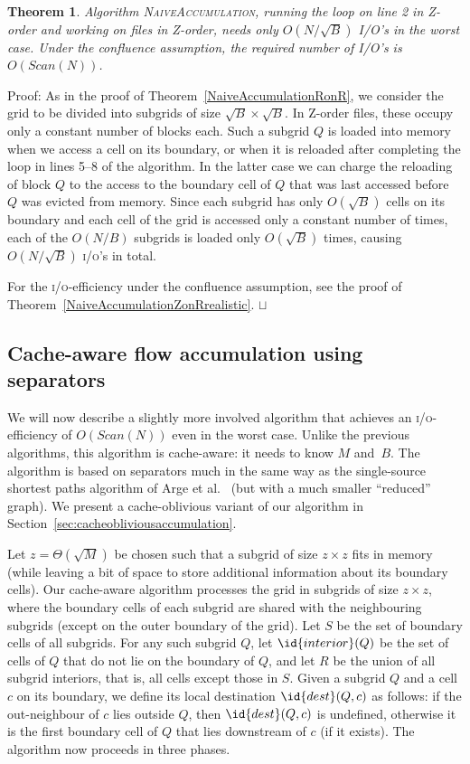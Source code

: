 \documentclass[10pt,a4paper]{article}
\newtheorem{theorem}{Theorem}
\newenvironment{proof}{Proof:}{\qed}
\def\squareforqed{\hbox{\rlap{$\sqcap$}$\sqcup$}}
\def\qed{\ifmmode\squareforqed\else{\unskip\nobreak\hfil
\penalty50\hskip1em\null\nobreak\hfil\squareforqed
\parfillskip=0pt\finalhyphendemerits=0\endgraf}\fi}
\def\io{\textsc{i/o}\xspace}
\def\ios{\textsc{i/o}'s\xspace}
\def\scan{\mathit{Scan}}
\begin{document}
\begin{theorem}
Algorithm \textsc{NaiveAccumulation}, running the loop on line 2 in Z-order and working on files in Z-order, needs only $O(N/\sqrt B)$ I/O's in the worst case. Under the confluence assumption, the required number of I/O's is $O(\scan(N))$.
\end{theorem}
\begin{proof}
As in the proof of Theorem~\ref{NaiveAccumulationRonR}, we consider the grid to be divided into subgrids of size $\sqrt B \times \sqrt B$. In Z-order files, these occupy only a constant number of blocks each. Such a subgrid $Q$ is loaded into memory when we access a cell on its boundary, or when it is reloaded after completing the loop in lines 5--8 of the algorithm. In the latter case we can charge the reloading of block $Q$ to the access to the boundary cell of $Q$ that was last accessed before $Q$ was evicted from memory. Since each subgrid has only $O(\sqrt B)$ cells on its boundary and each cell of the grid is accessed only a constant number of times, each of the $O(N/B)$ subgrids is loaded only $O(\sqrt B)$ times, causing $O(N/\sqrt B)$ \ios in total.

For the \io-efficiency under the confluence assumption, see the proof of Theorem~\ref{NaiveAccumulationZonRrealistic}.
\end{proof}


\subsection{Cache-aware flow accumulation using separators}\label{sec:cacheawareaccumulation}

We will now describe a slightly more involved algorithm that achieves an \io-efficiency of $O(\scan(N))$ even in the worst case. Unlike the previous algorithms, this algorithm is cache-aware: it needs to know $M$ and~$B$. The algorithm is based on separators much in the same way as the single-source shortest paths algorithm of Arge et al.~\cite{gridproblems} (but with a much smaller ``reduced'' graph). We present a cache-oblivious variant of our algorithm in Section~\ref{sec:cacheobliviousaccumulation}.

Let $z = \Theta(\sqrt M)$ be chosen such that a subgrid of size $z \times z$ fits in memory (while leaving a bit of space to store additional information about its boundary cells). Our cache-aware algorithm processes the grid in subgrids of size $z \times z$, where the boundary cells of each subgrid are shared with the neighbouring subgrids (except on the outer boundary of the grid). Let $S$ be the set of boundary cells of all subgrids. For any such subgrid $Q$, let $\id{interior}(Q)$ be the set of cells of $Q$ that do not lie on the boundary of $Q$, and let $R$ be the union of all subgrid interiors, that is, all cells except those in $S$. Given a subgrid $Q$ and a cell $c$ on its boundary, we define its local destination $\id{dest}(Q,c)$ as follows: if the out-neighbour of $c$ lies outside $Q$, then $\id{dest}(Q,c)$ is undefined, otherwise it is the first boundary cell of $Q$ that lies downstream of $c$ (if it exists). The algorithm now proceeds in three phases.
\end{document}
